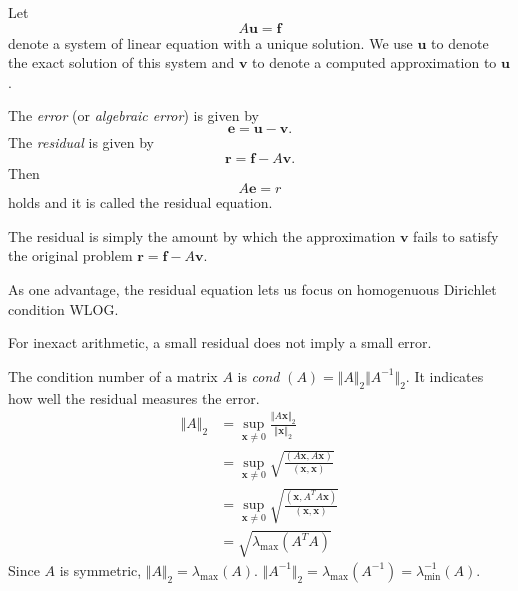 \begin{ntn}
  Let
  \begin{displaymath}
    A\mathbf{u}=\mathbf{f}
  \end{displaymath}
  denote a system of linear equation
  with a unique solution.
  We use $\mathbf{u}$ to denote
  the exact solution of this system
  and
  $\mathbf{v}$ to denote
 a computed approximation to $\mathbf{u}$.
\end{ntn}

\begin{defn}
  The \emph{error} (or \emph{algebraic error})
  is given by
  \begin{displaymath}
    \mathbf{e}=\mathbf{u}-\mathbf{v}.
  \end{displaymath}
The \emph{residual} is given by
\begin{equation}
 \mathbf{r}=\mathbf{f}-A\mathbf{v}.
\end{equation}
Then
\begin{equation}
  A\mathbf{e}=r
\end{equation}
holds and it is called the residual equation.
\end{defn}

\begin{rem}
  The residual is simply the amount by which
  the approximation $\mathbf{v}$ fails to satisfy the original problem
  $\mathbf{r}=\mathbf{f}-A\mathbf{v}$.

  As one advantage,
  the residual equation lets us focus on homogenuous Dirichlet
  condition WLOG.

  For inexact arithmetic,
  a small residual does not imply a small error.
\end{rem}

\begin{defn}
  The condition number of a matrix $A$ is \emph{cond}
  $(A)=\Vert A\Vert_2\Vert A^{-1}\Vert_2.$
  It indicates how well the residual measures the error.
  \begin{equation}
    \begin{aligned}
      \Vert A\Vert_2 &= \sup_{\mathbf{x}\neq 0}
      \frac{\Vert A\mathbf{x}\Vert_2}{\Vert \mathbf{x}\Vert_2}\\
      &=\sup_{\mathbf{x}\neq 0}
      \sqrt{\frac{(
          A\mathbf{x},A\mathbf{x})}{(\mathbf{x},\mathbf{x})}}\\
      &=\sup_{\mathbf{x}\neq 0}
      \sqrt{\frac{(
          \mathbf{x},A^TA\mathbf{x})}{(\mathbf{x},\mathbf{x})}}\\
      &=\sqrt{\lambda_{\max}(A^TA)}
    \end{aligned}
  \end{equation}
  Since $A$ is symmetric,
  $\Vert A\Vert_2=\lambda_{\max}(A)$.
  $\Vert A^{-1}\Vert_2=\lambda_{\max}(A^{-1})=\lambda^{-1}_{\min}(A)$.
\end{defn}

